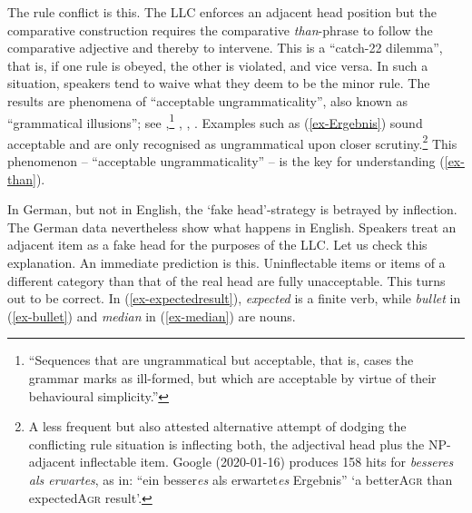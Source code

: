 \documentclass[output=paper
  ,nobabel
  ,uniformtopskip %
]{langscibook}
\begin{document}
\noindent
The rule conflict is this. The LLC enforces an adjacent head position but the comparative construction requires the comparative \emph{than}-phrase to follow the comparative adjective and thereby to intervene. This is a ``catch-22 dilemma'', that is, if one rule is obeyed, the other is violated, and vice versa. In such a situation, speakers tend to waive what they deem to be the minor rule. The results are phenomena of ``acceptable ungrammaticality'', also known as ``grammatical illusions''; see \citet*[159]{Bever1976},\footnote{``Sequences that are ungrammatical but acceptable, that is, cases the grammar marks as ill-formed, but which are acceptable by virtue of their behavioural simplicity.''}  \citet{Haider2011}, \citet{PhillipsLau2011}, \citet{Frazier2015}. Examples such as (\ref{ex-Ergebnis}) sound acceptable and are only recognised as ungrammatical upon closer scrutiny.\footnote{A less frequent but also attested alternative attempt of dodging the conflicting rule situation is inflecting both, the adjectival head plus the NP-adjacent inflectable item. Google (2020-01-16) produces 158 hits for \emph{besseres als erwartes}, as in:  ``ein besser\emph{es} als erwartet\emph{es} Ergebnis'' `a better\textsc{Agr} than expected\textsc{Agr} result'.}  This phenomenon – ``acceptable ungrammaticality'' – is the key for understanding (\ref{ex-than}).

In German, but not in English, the `fake head'-strategy is betrayed by inflection. The German data nevertheless show what happens in English. Speakers treat an adjacent item as a fake head for the purposes of the LLC. Let us check this explanation. An immediate prediction is this. Uninflectable items or items of a different category than that of the real head are fully unacceptable. This turns out to be correct. In (\ref{ex-expectedresult}), \emph{expected} is a finite verb, while \emph{bullet} in (\ref{ex-bullet}) and \emph{median} in (\ref{ex-median}) are nouns.

\eal
{}

\label{ex-bullet}

\label{ex-median}

\zl
\end{document}
